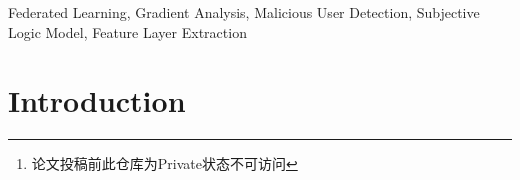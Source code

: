 \documentclass[conference]{IEEEtran}
\begin{document}
\begin{abstract}
我们在CIFAR-10、MNIST、OrganAMNIST等数据集上做了有关模型效率以及有关识别鲁棒性的实验，结果显示在处理时间上，我们的模型比先进的PCA方法降低了大约70\%。此外模型在准确率和F1分数上较PCA方法都有较大提升。同时，我们对比了池化技术来减少计算量并增强鲁棒性的算法，结果显示，相较于池化方法，我们的方法在效率和鲁棒性方面均有较大优势\cite{betterTogether}。

我们将模型命名为ViT-MGI并发布了其源代码，以方便该领域的未来研究：\href{https://github.com/LetMeFly666/FLDefinder}{https://github.com/LetMeFly666/FLDefinder}\footnote{论文投稿前此仓库为Private状态不可访问}。








\end{abstract}


\begin{IEEEkeywords}

Federated Learning, Gradient Analysis, Malicious User Detection, Subjective Logic Model, Feature Layer Extraction
\end{IEEEkeywords}

\section{Introduction}

\label{sec:intro}

\end{document}
